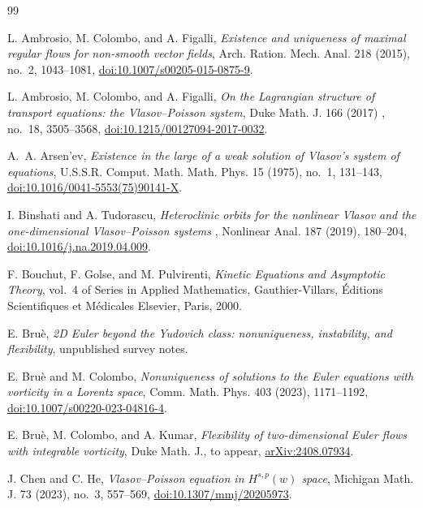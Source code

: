 \documentclass[11pt]{article}
\begin{document}
\begin{thebibliography}{99}
\raggedright
\small


L. Ambrosio, M. Colombo, and A. Figalli,
\emph{Existence and uniqueness of maximal regular flows for non-smooth
vector fields},
Arch. Ration. Mech. Anal. 218 (2015), no.~2, 1043--1081,
\href{https://doi.org/10.1007/s00205-015-0875-9}
{doi:10.1007/s00205-015-0875-9}.


L. Ambrosio, M. Colombo, and A. Figalli,
\emph{On the Lagrangian structure of transport equations: the
Vlasov--Poisson system},
Duke Math. J. 166 (2017) , no.~18, 3505--3568,
\href{https://doi.org/10.1215/00127094-2017-0032}
{doi:10.1215/00127094-2017-0032}.
 

A.~A.  Arsen'ev,
\emph{Existence in the large of a weak solution of Vlasov's system of
equations},
 U.S.S.R. Comput. Math. Math. Phys.  15 (1975),  no.~1,  131--143,
\href{https://doi.org/10.1016/0041-5553(75)90141-X}
{doi:10.1016/0041-5553(75)90141-X}.
 

I. Binshati and A. Tudorascu,
 \emph{ Heteroclinic orbits for the nonlinear Vlasov  and  the one-dimensional
Vlasov--Poisson systems },
 Nonlinear Anal. 187 (2019), 180--204,
\href{https://doi.org/10.1016/j.na.2019.04.009}
{doi:10.1016/j.na.2019.04.009}.

F. Bouchut, F. Golse, and M. Pulvirenti,
\emph{Kinetic Equations and Asymptotic Theory},
vol.~4 of Series in Applied Mathematics, Gauthier-Villars, \'Editions
Scientifiques et M\'edicales Elsevier, Paris, 2000.

E. Bru\`e,
\emph{2D Euler beyond the Yudovich class: nonuniqueness, instability, and
flexibility},
unpublished survey notes.


E. Bru\`e and M. Colombo,
\emph{Nonuniqueness of solutions to the Euler equations with vorticity in a
Lorentz space},
Comm. Math. Phys. 403 (2023), 1171--1192,
\href{https://doi.org/10.1007/s00220-023-04816-4}
{doi:10.1007/s00220-023-04816-4}.

E. Bru\`e, M. Colombo, and A. Kumar,
\emph{Flexibility of two-dimensional Euler flows with integrable vorticity},
Duke Math. J., to appear,
\href{https://arxiv.org/abs/2408.07934}
{arXiv:2408.07934}.


J. Chen and C. He,
\emph{Vlasov--Poisson equation in $H^{s,p}(w)$ space},
Michigan Math. J. 73 (2023), no.~3, 557--569,
\href{https://doi.org/10.1307/mmj/20205973}
{doi:10.1307/mmj/20205973}.


\end{thebibliography}
\end{document}

